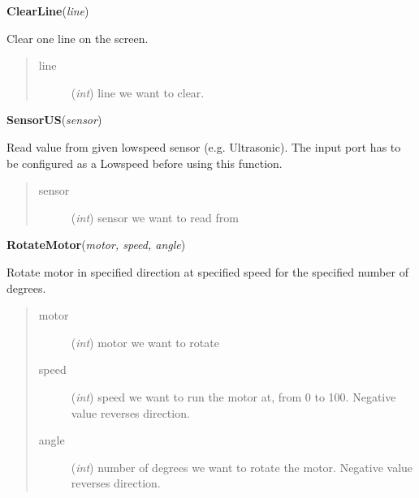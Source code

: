 \documentclass[10pt,a4paper]{article}
\begin{document}
 

\vspace{6pt}
{\bf ClearLine}({\it line}) 
    
    Clear one line on the screen.
    




\begin{quote}
    \begin{description}
        
\item[line] ({\emph{int}}) line we want to clear.

    \end{description}
\end{quote}

 

\vspace{6pt}
{\bf SensorUS}({\it sensor}) 

    Read value from given lowspeed sensor (e.g. Ultrasonic). The input port 
    has to be configured as a Lowspeed before using this function.
    




\begin{quote}
    \begin{description}
        
\item[sensor] ({\emph{int}}) sensor we want to read from

    \end{description}
\end{quote}

 

\vspace{6pt}
{\bf RotateMotor}({\it motor, speed, angle}) 
    
    Rotate motor in specified direction at specified speed for the specified
    number of degrees.




    


\begin{quote}
    \begin{description}
        
\item[motor] ({\emph{int}}) motor we want to rotate

\item[speed] ({\emph{int}}) speed we want to run the motor at, from 0 to 100. Negative value reverses direction.

\item[angle] ({\emph{int}}) number of degrees we want to rotate the motor. Negative value reverses direction.

    \end{description}
\end{quote}
\end{document}
